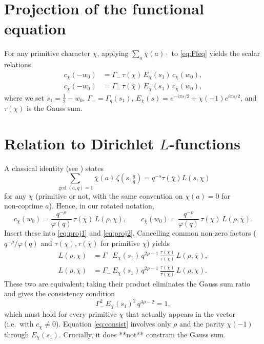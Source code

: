 \documentclass[12pt,a4paper]{article}
\theoremstyle{definition}
\begin{document}
\section{Projection of the functional equation}
For any primitive character \(\chi\), applying \(\sum_{a}\overline{\chi}(a)\cdot\) to \eqref{eq:Ffeq} yields the scalar relations
\begin{align}
c_{\overline{\chi}}(-w_0) & = \Gamma_{-}\,\tau(\chi)\,E_\chi(s_1)\,c_\chi(w_0),\label{eq:proj1}\\
c_\chi(-w_0) & = \Gamma_{-}\,\tau(\overline{\chi})\,E_\chi(s_1)\,c_{\overline{\chi}}(w_0),\label{eq:proj2}
\end{align}
where we set \(s_1=\frac12-w_0\), \(\Gamma_{-}=\Gamma_q(s_1)\),
\(E_\chi(s)=e^{-i\pi s/2}+\chi(-1)e^{i\pi s/2}\), and \(\tau(\chi)\) is the Gauss sum.

\section{Relation to Dirichlet \(L\)-functions}
A classical identity (see \cite{Washington}) states
\[
\sum_{\gcd(a,q)=1}\overline{\chi}(a)\,\zeta(s,\tfrac{a}{q}) = q^{-s}\tau(\overline{\chi})L(s,\chi)
\]
for any \(\chi\) (primitive or not, with the same convention on \(\chi(a)=0\) for non‑coprime \(a\)).  Hence, in our rotated notation,
\[
c_\chi(w_0) = \frac{q^{-\rho}}{\varphi(q)}\,\tau(\overline{\chi})\,L(\rho,\chi),\qquad
c_{\overline{\chi}}(w_0) = \frac{q^{-\rho}}{\varphi(q)}\,\tau(\chi)\,L(\rho,\overline{\chi}).
\]
Insert these into \eqref{eq:proj1} and \eqref{eq:proj2}.  Cancelling common non‑zero factors (\(q^{-\rho}/\varphi(q)\) and \(\tau(\chi),\tau(\overline{\chi})\) for primitive \(\chi\)) yields
\begin{align}
L(\rho,\chi) & = \Gamma_{-}\,E_\chi(s_1)\,q^{2\rho-1}\,\frac{\tau(\chi)}{\tau(\overline{\chi})}\,L(\rho,\overline{\chi}),\\
L(\rho,\overline{\chi}) & = \Gamma_{-}\,E_\chi(s_1)\,q^{2\rho-1}\,\frac{\tau(\overline{\chi})}{\tau(\chi)}\,L(\rho,\chi).
\end{align}
These two are equivalent; taking their product eliminates the Gauss sum ratio and gives the consistency condition
\begin{equation}\label{eq:consist}
\Gamma_{-}^2\,E_\chi(s_1)^2\,q^{4\rho-2}=1,
\end{equation}
which must hold for every primitive \(\chi\) that actually appears in the vector (i.e.\ with \(c_\chi\neq0\)).  Equation \eqref{eq:consist} involves only \(\rho\) and the parity \(\chi(-1)\) through \(E_\chi(s_1)\).  Crucially, it does **not** constrain the Gauss sum.
\end{document}
